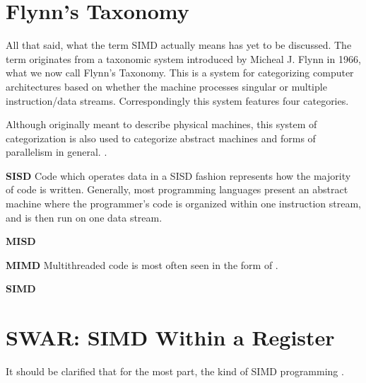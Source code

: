\section{Flynn's Taxonomy}
All that said, what the term SIMD actually means has yet to be discussed. The
term originates from a taxonomic system introduced by Micheal J. Flynn in 1966,
what we now call Flynn's Taxonomy. This is a system for categorizing computer
architectures based on whether the machine processes singular or multiple
instruction/data streams. Correspondingly this system features four categories.


Although originally meant to describe physical machines, this system of
categorization is also used to categorize abstract machines and forms of
parallelism in general. .

\textbf{SISD} Code which operates data in a SISD fashion represents how the
majority of code is written. Generally, most programming languages present an
abstract machine where the programmer's code is organized within one instruction
stream, and is then run on one data stream. 

\textbf{MISD}

\textbf{MIMD} Multithreaded code is most often seen in the form of .

\textbf{SIMD}

\section{SWAR: SIMD Within a Register}

It should be clarified that for the most part, the kind of SIMD programming .
